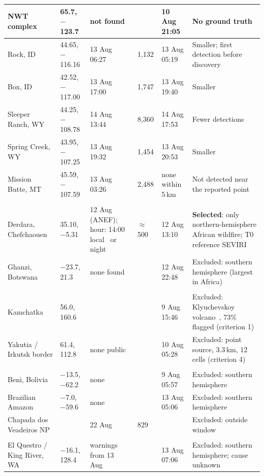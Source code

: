 \documentclass[11pt]{article}
\begin{document}
\begin{longtable}{|p{2.6cm}|p{1.9cm}|p{2.6cm}|p{1.3cm}|p{1.9cm}|p{3.6cm}|}
\hline
NWT complex & 65.7, $-$123.7 & not found & & 10 Aug 21:05 & No ground truth \\
\hline
Rock, ID & 44.65, $-$116.16 & 13 Aug 06:27~\cite{nifc2025wfigs} & 1,132 & 13 Aug 05:19 & Smaller; first detection before discovery \\
\hline
Box, ID & 42.52, $-$117.00 & 13 Aug 17:00~\cite{nifc2025wfigs} & 1,747 & 13 Aug 19:40 & Smaller \\
\hline
Sleeper Ranch, WY & 44.25, $-$108.78 & 14 Aug 13:44~\cite{nifc2025wfigs} & 8,360 & 14 Aug 17:53 & Fewer detections \\
\hline
Spring Creek, WY & 43.95, $-$107.25 & 13 Aug 19:32~\cite{nifc2025wfigs} & 1,454 & 13 Aug 20:53 & Smaller \\
\hline
Mission Butte, MT & 45.59, $-$107.59 & 13 Aug 03:26~\cite{nifc2025wfigs} & 2,488 & none within 5\,km & Not detected near the reported point \\
\hline
\rowcolor{tablegroup}
\multicolumn{6}{|l|}{\textit{Africa}} \\
\hline
Derdara, Chefchaouen & 35.10, $-$5.31 & 12 Aug (ANEF); hour: 14:00 local~\cite{nap2025derdara} or night~\cite{medias24_2025incendies} & $\approx$500~\cite{hespress2025chefchaouen} & 12 Aug 13:10 & \textbf{Selected}: only northern-hemisphere African wildfire; T0 reference SEVIRI \\
\hline
Ghanzi, Botswana & $-$23.7, 21.3 & none found & & 12 Aug 22:48 & Excluded: southern hemisphere (largest in Africa) \\
\hline
\rowcolor{tablegroup}
\multicolumn{6}{|l|}{\textit{Asia (Siberia / Russian Far East)}} \\
\hline
Kamchatka & 56.0, 160.6 & & & 9 Aug 15:46 & Excluded: Klyuchevskoy volcano~\cite{eastrussia2025klyuchevskoy}, 73\% flagged (criterion 1) \\
\hline
Yakutia / Irkutsk border & 61.4, 112.8 & none public & & 10 Aug 05:28 & Excluded: point source, 3.3\,km, 12 cells (criterion 4) \\
\hline
\rowcolor{tablegroup}
\multicolumn{6}{|l|}{\textit{South America}} \\
\hline
Beni, Bolivia & $-$13.5, $-$62.2 & none & & 9 Aug 05:57 & Excluded: southern hemisphere \\
\hline
Brazilian Amazon & $-$7.0, $-$59.6 & none & & 13 Aug 05:06 & Excluded: southern hemisphere \\
\hline
Chapada dos Veadeiros NP & & 22 Aug & 829 & & Excluded: outside window~\cite{terra2025chapada} \\
\hline
\rowcolor{tablegroup}
\multicolumn{6}{|l|}{\textit{Oceania}} \\
\hline
El Questro / King River, WA & $-$16.1, 128.4 & warnings from 13 Aug~\cite{broome2025elquestro} & & 13 Aug 07:06 & Excluded: southern hemisphere; cause unknown \\
\hline
\end{longtable}
\end{document}
